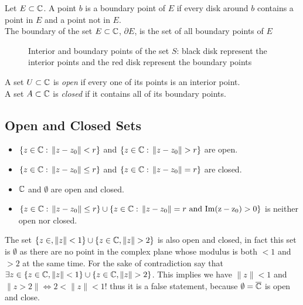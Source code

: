 \documentclass{caesar_book}
\begin{document}
\begin{definition}
    Let $E \subset {\mathbb{C}}$. A point $b$ is a boundary point of  $E$ if every disk around  $b$ contains a point in  $E$ and a point not in  $E$.\\
    The boundary of the set  $E \subset {\mathbb{C}}$, $\partial E$, is the set of all boundary points of $E$
\end{definition}

\begin{figure}[ht]
    \centering
    \caption{Interior and boundary points of the set $S$: black disk represent the interior points and the red disk represent the boundary points}
    \label{fig:interior_points}
\end{figure}
\begin{definition}
    A set $U \subset {\mathbb{C}}$ is \emph{open} if every one of its points is an
    interior point. \\
    A set $A \subset {\mathbb{C}}$ is \emph{closed} if it contains all of its boundary
    points.
\end{definition}

\subsection{Open and Closed Sets}
\begin{itemize}
    \item $\{z \in {\mathbb{C}}:\, \|z-z_0\| < r \}$ and $\{z \in \sC:\, \|z-z_0\|>r \}$ are open.
    \item $\{z \in {\mathbb{C}}:\, \|z-z_0\| \le r \}$ and $\{z \in {\mathbb{C}}:\, \|z-z_0\| = r \}$ are closed.
    \item ${\mathbb{C}}$ and $\emptyset$ are open and closed.
    \item $\{z \in {\mathbb{C}}:\, \|z-z_0\| \le r \} \cup  \{z \in {\mathbb{C}}:\, \|z-z_0\| = r \text{ and } \rm{Im}(z-z_0) > 0 \}$ is neither open nor closed.
\end{itemize}

The set $\{ z \in, \|z\| < 1\} \cup \{z \in \sC, \|z\|>2\}$ is also open and
closed, in fact this set is $\emptyset$ as there are no point in the complex
plane whose modulus is both $<1$ and  $>2$ at the same time. For the sake of
contradiction say that  
    $\exists z \in \{z \in {\mathbb{C}}, \|z\| < 1 \} \cup \{z \in {\mathbb{C}}, \|z\| > 2\}$. This implies we have $\|z\|<1$ and $\|z>2\| \iff 2 < \|z\| < 1$! thus it is a false statement, because $\emptyset = \overline{{\mathbb{C}}}$ is open and close.
\end{document}
